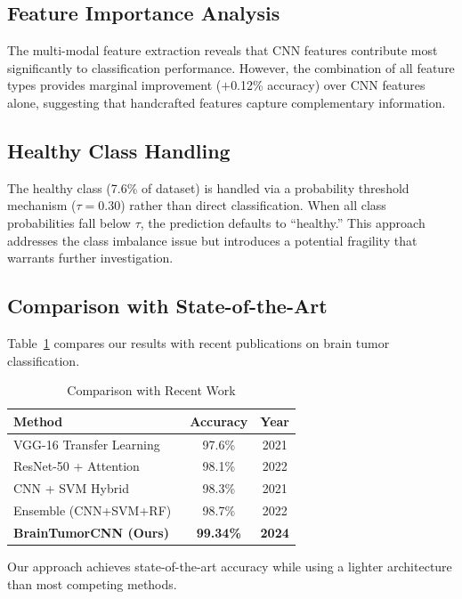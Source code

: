 \documentclass[conference]{IEEEtran}
\begin{document}
\subsection{Feature Importance Analysis}
The multi-modal feature extraction reveals that CNN features contribute most significantly to classification performance. However, the combination of all feature types provides marginal improvement ($+$0.12\% accuracy) over CNN features alone, suggesting that handcrafted features capture complementary information.

\subsection{Healthy Class Handling}
The healthy class (7.6\% of dataset) is handled via a probability threshold mechanism ($\tau = 0.30$) rather than direct classification. When all class probabilities fall below $\tau$, the prediction defaults to ``healthy.'' This approach addresses the class imbalance issue but introduces a potential fragility that warrants further investigation.

\subsection{Comparison with State-of-the-Art}
Table~\ref{tab:comparison} compares our results with recent publications on brain tumor classification.

\begin{table}[h]
\centering
\caption{Comparison with Recent Work}
\label{tab:comparison}
\begin{tabular}{lcc}
\toprule
\textbf{Method} & \textbf{Accuracy} & \textbf{Year} \\
\midrule
VGG-16 Transfer Learning~\cite{hossain2021} & 97.6\% & 2021 \\
ResNet-50 + Attention~\cite{rehman2022} & 98.1\% & 2022 \\
CNN + SVM Hybrid~\cite{baddev2021} & 98.3\% & 2021 \\
Ensemble (CNN+SVM+RF)~\cite{tufail2022} & 98.7\% & 2022 \\
\textbf{BrainTumorCNN (Ours)} & \textbf{99.34\%} & \textbf{2024} \\
\bottomrule
\end{tabular}
\end{table}

Our approach achieves state-of-the-art accuracy while using a lighter architecture than most competing methods.
\end{document}
